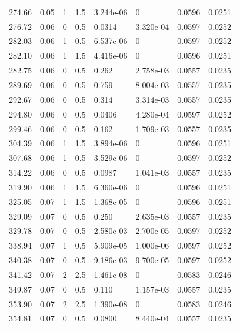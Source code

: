 \documentclass[preview]{standalone}
\begin{document}
{{{\begin{tabular}{L{1.2cm}C{1.2cm} C{0.3cm}C{0.5cm} C{1.4cm}C{1.4cm} C{1.4cm}C{1.4cm}}
  274.66  &  0.05  & 1     & 1.5 &  3.244e-06  & 0  & 0.0596 &  0.0251   \\ 
  276.72  &  0.06  & 0     & 0.5 &  0.0314  & 3.320e-04  & 0.0597 &  0.0252   \\ 
  282.03  &  0.06  & 1     & 0.5 &  6.537e-06  & 0  & 0.0597 &  0.0252   \\ 
  282.10  &  0.06  & 1     & 1.5 &  4.416e-06  & 0  & 0.0596 &  0.0251   \\ 
  282.75  &  0.06  & 0     & 0.5 &  0.262  & 2.758e-03  & 0.0557 &  0.0235   \\ 
  289.69  &  0.06  & 0     & 0.5 &  0.759  & 8.004e-03  & 0.0557 &  0.0235   \\ 
  292.67  &  0.06  & 0     & 0.5 &  0.314  & 3.314e-03  & 0.0557 &  0.0235   \\ 
  294.80  &  0.06  & 0     & 0.5 &  0.0406  & 4.280e-04  & 0.0597 &  0.0252   \\ 
  299.46  &  0.06  & 0     & 0.5 &  0.162  & 1.709e-03  & 0.0557 &  0.0235   \\ 
  304.39  &  0.06  & 1     & 1.5 &  3.894e-06  & 0  & 0.0596 &  0.0251   \\ 
  307.68  &  0.06  & 1     & 0.5 &  3.529e-06  & 0  & 0.0597 &  0.0252   \\ 
  314.22  &  0.06  & 0     & 0.5 &  0.0987  & 1.041e-03  & 0.0557 &  0.0235   \\ 
  319.90  &  0.06  & 1     & 1.5 &  6.360e-06  & 0  & 0.0596 &  0.0251   \\ 
  325.05  &  0.07  & 1     & 1.5 &  1.368e-05  & 0  & 0.0596 &  0.0251   \\ 
  329.09  &  0.07  & 0     & 0.5 &  0.250  & 2.635e-03  & 0.0557 &  0.0235   \\ 
  329.78  &  0.07  & 0     & 0.5 &  2.580e-03  & 2.700e-05  & 0.0597 &  0.0252   \\ 
  338.94  &  0.07  & 1     & 0.5 &  5.909e-05  & 1.000e-06  & 0.0597 &  0.0252   \\ 
  340.38  &  0.07  & 0     & 0.5 &  9.186e-03  & 9.700e-05  & 0.0597 &  0.0252   \\ 
  341.42  &  0.07  & 2     & 2.5 &  1.461e-08  & 0  & 0.0583 &  0.0246   \\ 
  349.87  &  0.07  & 0     & 0.5 &  0.110  & 1.157e-03  & 0.0557 &  0.0235   \\ 
  353.90  &  0.07  & 2     & 2.5 &  1.390e-08  & 0  & 0.0583 &  0.0246   \\ 
  354.81  &  0.07  & 0     & 0.5 &  0.0800  & 8.440e-04  & 0.0557 &  0.0235   \\ 

\end{tabular}}}}
\end{document}
